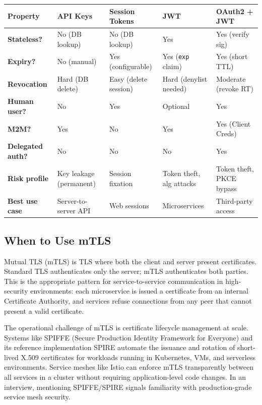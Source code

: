 \documentclass[11pt,a4paper]{article}
\begin{document}
\begin{center}
\renewcommand{\arraystretch}{1.4}
\begin{tabular}{>{\bfseries}p{2.6cm} p{2.5cm} p{2.5cm} p{2.5cm} p{2.7cm}}
\toprule
\textbf{Property} & \textbf{API Keys} & \textbf{Session Tokens} & \textbf{JWT} & \textbf{OAuth2 + JWT} \\
\midrule
Stateless? & No (DB lookup) & No (DB lookup) & Yes & Yes (verify sig) \\
Expiry? & No (manual) & Yes (configurable) & Yes (\texttt{exp} claim) & Yes (short TTL) \\
Revocation & Hard (DB delete) & Easy (delete session) & Hard (denylist needed) & Moderate (revoke RT) \\
Human user? & No & Yes & Optional & Yes \\
M2M? & Yes & No & Yes & Yes (Client Creds) \\
Delegated auth? & No & No & No & Yes \\
Risk profile & Key leakage (permanent) & Session fixation & Token theft, alg attacks & Token theft, PKCE bypass \\
Best use case & Server-to-server API & Web sessions & Microservices & Third-party access \\
\bottomrule
\end{tabular}
\end{center}

\subsection{When to Use mTLS}

Mutual TLS (mTLS) is TLS where both the client and server present certificates. Standard TLS authenticates only the server; mTLS authenticates both parties. This is the appropriate pattern for service-to-service communication in high-security environments: each microservice is issued a certificate from an internal Certificate Authority, and services refuse connections from any peer that cannot present a valid certificate.

The operational challenge of mTLS is certificate lifecycle management at scale. Systems like SPIFFE (Secure Production Identity Framework for Everyone) and its reference implementation SPIRE automate the issuance and rotation of short-lived X.509 certificates for workloads running in Kubernetes, VMs, and serverless environments. Service meshes like Istio can enforce mTLS transparently between all services in a cluster without requiring application-level code changes. In an interview, mentioning SPIFFE/SPIRE signals familiarity with production-grade service mesh security.
\end{document}
